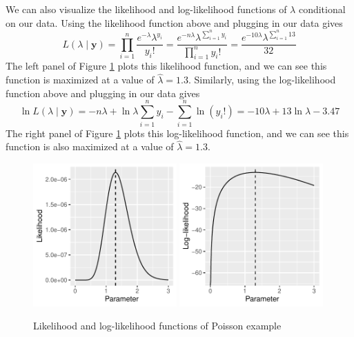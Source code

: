 \documentclass[11pt,letterpaper]{article}
\begin{document}
\noindent We can also visualize the likelihood and log-likelihood functions of $\lambda$ conditional on our data. Using the likelihood function above and plugging in our data gives
$$L(\lambda \mid \bm{y}) = \prod_{i = 1}^n \frac{e^{-\lambda} \lambda^{y_i} }{y_i!} = \frac{e^{-n \lambda} \lambda^{\sum_{i=1}^n y_i}}{\prod_{i = 1}^n y_i!} = \frac{e^{-10 \lambda} \lambda^{\sum_{i=1}^n 13}}{32}$$
The left panel of Figure \ref{fig:pois_lll} plots this likelihood function, and we can see this function is maximized at a value of $\widehat{\lambda} = 1.3$. Similarly, using the log-likelihood function above and plugging in our data gives
$$\ln L(\lambda \mid \bm{y}) = -n \lambda + \ln \lambda \sum_{i = 1}^n y_i - \sum_{i = 1}^n \ln (y_i!) = -10 \lambda + 13 \ln \lambda - 3.47$$
The right panel of Figure \ref{fig:pois_lll} plots this log-likelihood function, and we can see this function is also maximized at a value of $\widehat{\lambda} = 1.3$.

\begin{figure}[htbp]
  \caption{Likelihood and log-likelihood functions of Poisson example}
  \label{fig:pois_lll}
  \centering
  \includegraphics[width=0.49\textwidth]{likelihood.pdf}
  \includegraphics[width=0.49\textwidth]{log_likelihood.pdf}
\end{figure}
\end{document}
